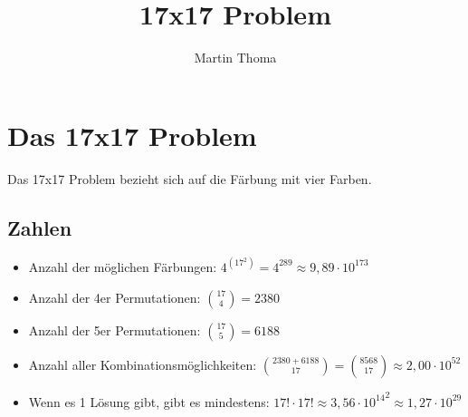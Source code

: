 \documentclass[a4paper,11pt]{scrartcl}
\begin{document}
 \title{17x17 Problem}
 \author{Martin Thoma}

 \setcounter{section}{1}
 \section*{Das 17x17 Problem}
 Das 17x17 Problem bezieht sich auf die Färbung mit vier Farben.
 \subsection{Zahlen}
   \begin{itemize}
     \item Anzahl der möglichen Färbungen: $4^{(17^2)} = 4^{289} \approx 9,89 \cdot 10^{173}$
     \item Anzahl der 4er Permutationen: $\binom{17}{4} = 2380$
     \item Anzahl der 5er Permutationen: $\binom{17}{5} = 6188$
     \item Anzahl aller Kombinationsmöglichkeiten: $\binom{2380+6188}{17} = \binom{8568}{17} \approx 2,00 \cdot 10^{52}$
     \item Wenn es 1 Lösung gibt, gibt es mindestens: $17! \cdot 17! \approx {3,56 \cdot 10^{14}}^2 \approx 1,27 \cdot 10^{29}$
   \end{itemize}
\end{document}
